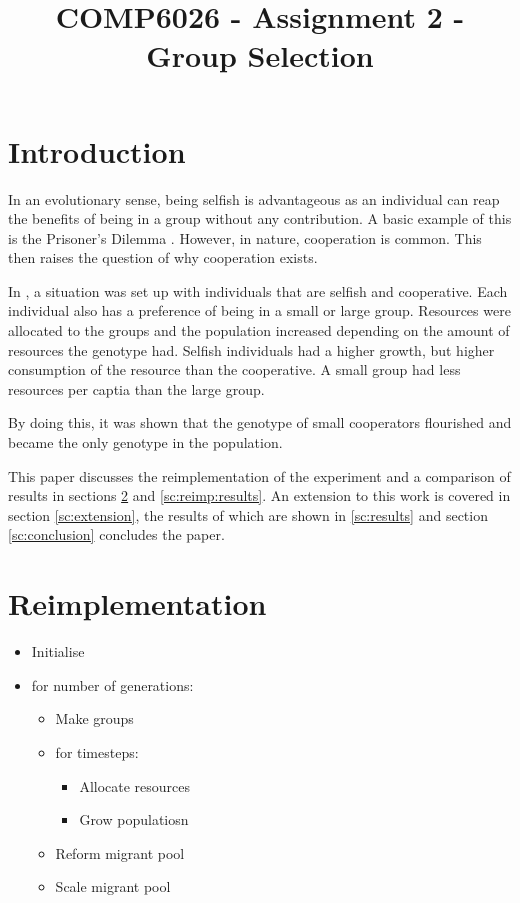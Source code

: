 \documentclass[11pt]{ecsarticle}
\title{COMP6026 - Assignment 2 - Group Selection}
\begin{document}
\maketitle
 
\section{Introduction}

In an evolutionary sense, being selfish is advantageous \cite{} as an individual can reap the benefits of being in a group without any contribution.
A basic example of this is the Prisoner's Dilemma \cite{}.
However, in nature, cooperation is common. 
This then raises the question of why cooperation exists. 

In \cite{powers2007individual}, a situation was set up with individuals that are selfish and cooperative. 
Each individual also has a preference of being in a small or large group. 
Resources were allocated to the groups and the population increased depending on the amount of resources the genotype had. 
Selfish individuals had a higher growth, but higher consumption of the resource than the cooperative.
A small group had less resources per captia than the large group.

By doing this, it was shown that the genotype of small cooperators flourished and became the only genotype in the population. 


This paper discusses the reimplementation of the experiment \cite{powers2007individual} and a comparison of results in sections \ref{sc:reimplementation} and \ref{sc:reimp:results}.
An extension to this work is covered in section \ref{sc:extension}, the results of which are shown in \ref{sc:results} and section \ref{sc:conclusion} concludes the paper.


\section{Reimplementation}\label{sc:reimplementation}
\begin{itemize}
 \item Initialise
 \item for number of generations:
 \begin{itemize}
  \item Make groups
  \item for timesteps:
  \begin{itemize}
   \item Allocate resources
   \item Grow populatiosn
  \end{itemize}
  \item Reform migrant pool
  \item Scale migrant pool
 \end{itemize}

\end{itemize}
\end{document}
